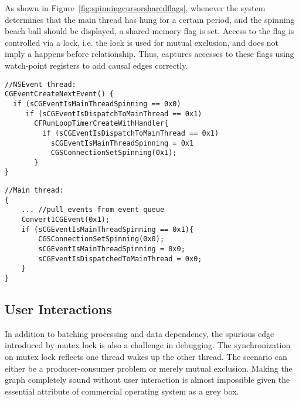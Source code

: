 As shown in Figure~\ref{fig:spinningcursorsharedflags},
whenever the system determines that the main thread has hung for a certain
period, and the spinning beach ball should be displayed, a shared-memory flag
is set. Access to the flag is controlled via a lock, i.e. the lock is used for
mutual exclusion, and does not imply a happens before relationship. Thus, \xxx
captures accesses to these flags using watch-point registers to add causal edges
correctly.

\begin{figure*}[ht!]
\begin{minipage}[t]{0.5\textwidth}
\begin{lstlisting}
//NSEvent thread:
CGEventCreateNextEvent() {
  if (sCGEventIsMainThreadSpinning == 0x0)
     if (sCGEventIsDispatchToMainThread == 0x1)
       CFRunLoopTimerCreateWithHandler{
         if (sCGEventIsDispatchToMainThread == 0x1)
           sCGEventIsMainThreadSpinning = 0x1
           CGSConnectionSetSpinning(0x1);
       }
}
\end{lstlisting}
\end{minipage}
\begin{minipage}[t]{0.4\textwidth}
\begin{lstlisting}
//Main thread:
{
	... //pull events from event queue
	Convert1CGEvent(0x1);
	if (sCGEventIsMainThreadSpinning == 0x1){
  		CGSConnectionSetSpinning(0x0);
  		sCGEventIsMainThreadSpinning = 0x0;
  		sCGEventIsDispatchedToMainThread = 0x0;
	}
}
\end{lstlisting}
\end{minipage}
    \caption{Spinning Cursor Shared Flags}
    \label{fig:spinningcursorsharedflags}
\end{figure*}

\subsection{User Interactions}\label{subsec:userinteraction}

In addition to batching processing and data dependency, the spurious edge
introduced by mutex lock is also a challenge in debugging. The synchronization
on mutex lock reflects one thread wakes up the other thread. The scenario can
either be a producer-consumer problem or merely mutual exclusion. Making the
graph completely sound without user interaction is almost impossible given the
essential attribute of commercial operating system as a grey box.

